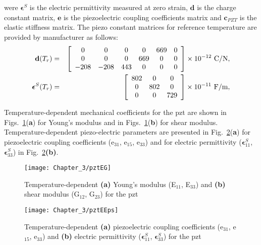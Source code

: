 %
%
were \(\boldsymbol{\epsilon}^S\) is the electric permittivity measured at zero strain, \(\boldsymbol{d}\) is the charge constant matrix, \(\boldsymbol{e}\) is the piezoelectric coupling coefficients matrix and \(\boldsymbol{c}_{PZT}\) is the elastic stiffness matrix.
The piezo constant matrices for reference temperature are provided by manufacturer as follows:
\begin{eqnarray}
	\textbf{d}(T_r) & = & \left[
	\begin{array}{cccccc}
	0 & 0 & 0 & 0 & 669 & 0\\
	0 & 0 & 0 & 669 & 0 & 0\\
	-208 & -208 & 443 & 0 & 0 & 0
	\end{array}\right] \times10^{-12}\ \unit[per-mode = symbol]{\coulomb\per\newton},\\
	\boldsymbol{\epsilon}^S(T_r) & = & \left[
	\begin{array}{ccc}
	802 & 0 & 0\\
	0 & 802 & 0\\
	0 & 0 & 729
\end{array}\right] \times10^{-11}\ \unit[per-mode = symbol]{\farad\per\meter},
\end{eqnarray}

Temperature-dependent mechanical coefficients for the \ac{pzt} are shown in Figs.~\ref{fig:pztEG}(\textbf{a}) for Young's modulus and in Figs.~\ref{fig:pztEG}(\textbf{b}) for shear modulus.
Temperature-dependent piezo-electric parameters are presented in Fig.~\ref{fig:pztEEps}(\textbf{a}) for piezoelectric coupling coefficients (e\(_{31}\), e\(_{15}\), e\(_{33}\)) and for electric permittivity (\(\boldsymbol{\epsilon}^S_{11}\), \(\boldsymbol{\epsilon}^S_{33}\)) in Fig.~\ref{fig:pztEEps}\textbf{(b)}.

\begin{figure}
	\begin{center}
		\texttt{[image: Chapter\_3/pztEG]}
	\end{center}
	\caption{Temperature-dependent \textbf{(a)} Young's modulus (E\(_{11}\), E\(_{33}\)) and \textbf{(b)} shear modulus (G\(_{12}\), G\(_{23}\)) for the \acf{pzt}}
	\label{fig:pztEG}
\end{figure}
\begin{figure}
	\begin{center}
		\texttt{[image: Chapter\_3/pztEEps]}
	\end{center}
	\caption{Temperature-dependent \textbf{(a)} piezoelectric coupling coefficients (e\(_{31}\), e\(_{15}\), e\(_{33}\)) and \textbf{(b)} electric permittivity (\(\boldsymbol{\epsilon}^S_{11}\), \(\boldsymbol{\epsilon}^S_{33}\)) for the \acf{pzt}}
	\label{fig:pztEEps}
\end{figure}
